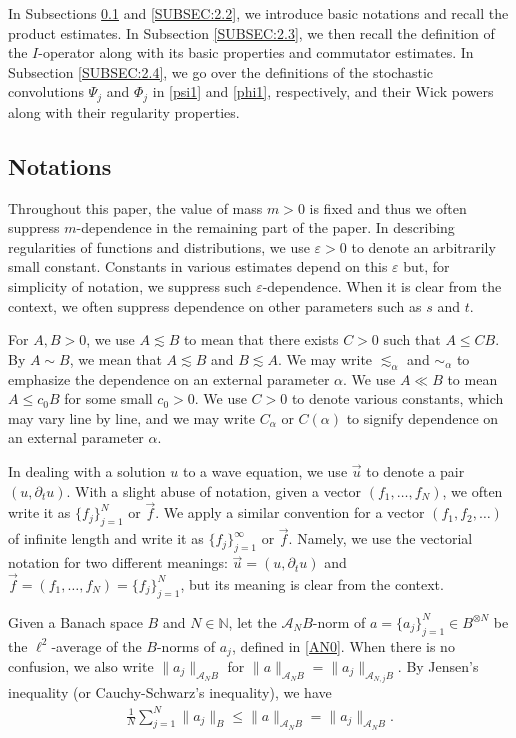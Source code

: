 \documentclass[letterpaper, 11pt,  reqno]{amsart}
\newcommand{\1}{\hspace{0.5mm}\text{I}\hspace{0.2mm}}
\newcommand{\N}{\mathbb{N}}
\newcommand{\al}{\alpha}
\newcommand{\eps}{\varepsilon}
\newcommand{\dt}{\partial_t}
\newcommand{\les}{\lesssim}
\newcommand{\A}{\mathcal{A}}
\renewcommand{\l}{\ell}
\numberwithin{equation}{section}
\numberwithin{theorem}{section}
\begin{document}
In Subsections \ref{SUBSEC:2.1}
and  \ref{SUBSEC:2.2}, 
we introduce basic notations
and recall the product estimates.
In Subsection \ref{SUBSEC:2.3}, 
we then 
recall the definition of the $I$-operator
along with its basic properties
and commutator estimates.
In Subsection \ref{SUBSEC:2.4}, 
we go over the 
definitions of the stochastic convolutions
$\Psi_j$
and $\Phi_j$
in \eqref{psi1}
and \eqref{phi1}, respectively, 
and their Wick powers
along with their regularity properties.


\subsection{Notations}
\label{SUBSEC:2.1}


Throughout this paper, the value of mass $m > 0$
is fixed and thus we often suppress $m$-dependence
in the remaining part of the paper.
In describing regularities of functions and distributions, 
we use $\eps > 0$ to denote an arbitrarily small constant.
Constants in various estimates depend on this $\eps$ but,
for simplicity of notation,  we suppress such $\eps$-dependence.
When it is clear from the context, we often suppress
dependence on other parameters such as $s$ and $t$.



For $A, B > 0$, we use $A\lesssim B$ to mean that
there exists $C>0$ such that $A \leq CB$.
By $A\sim B$, we mean that $A\lesssim B$ and $B \lesssim A$.
We may write  $\les_{\al}$ and  $\sim_{\al}$  to 
emphasize the dependence  on an external parameter $\al$.
We use $A \ll B$ to mean
$A\le c_0 B$
for some small $c_0 > 0$.
We use $C>0$ to denote various constants, which may vary line by line,
and we may write $C_\al$ or $C(\al)$ to  signify  dependence on an external parameter
$\al$.




In dealing with a solution $u$ to a wave equation, 
we use 
$\vec u$ to denote a pair $ ( u, \dt u)$.
With a slight abuse of notation, 
given a vector $(f_1, \dots, f_N)$, 
we often write it as $\{f_j \}_{j = 1}^N$
or $\vec f$.
We apply a similar convention for a vector 
$(f_1, f_2, \dots)$ of infinite length and write it as 
$\{f_j \}_{j = 1}^\infty$
or $\vec f$.
Namely,  we use the vectorial notation 
for two different meanings: $\vec u = (u, \dt u)$
and $
 \vec f = (f_1, \dots, f_N)
 = \{f_j \}_{j = 1}^N $,
but its meaning is clear from the context.


Given 
a Banach space $B$ and 
$N \in \N$,
let the $\A_N B$-norm 
of $ a = \{ a_j \}_{j = 1}^N \in B^{\otimes N}$
be the $\l^2$-average of the $B$-norms of $a_j$, defined in 
 \eqref{AN0}.
When there is no confusion, 
we also write 
$\|a_j \|_{\A_{N}B}$ for $\|a \|_{\A_{N}B}  = \|a_j \|_{\A_{N, j}B}$. 
By Jensen's inequality (or Cauchy-Schwarz's inequality), 
we have 
\begin{align}
 \frac{1}{N} \sum_{j = 1}^N \| a_j \|_B
\le     \|  a \|_{\A_N B} = \|a_j \|_{\A_{N}B}. 
\label{AN1a}
\end{align}
\end{document}

